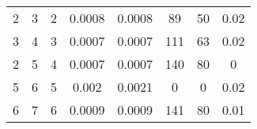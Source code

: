 \begin{table}[]
\begin{tabular}{@{}cccccccc@{}}
2                                                         & 3                                                           & 2                                                    & 0.0008                                                                           & 0.0008                                                                          & 89                                                                              & 50                                                                                   & 0.02                                                                       \\
3                                                         & 4                                                           & 3                                                    & 0.0007                                                                           & 0.0007                                                                          & 111                                                                             & 63                                                                                   & 0.02                                                                       \\
2                                                         & 5                                                           & 4                                                    & 0.0007                                                                           & 0.0007                                                                          & 140                                                                             & 80                                                                                   & 0                                                                          \\
5                                                         & 6                                                           & 5                                                    & 0.002                                                                            & 0.0021                                                                          & 0                                                                               & 0                                                                                    & 0.02                                                                       \\
6                                                         & 7                                                           & 6                                                    & 0.0009                                                                           & 0.0009                                                                          & 141                                                                             & 80                                                                                   & 0.01                                                                       \\

\end{tabular}
\end{table}
